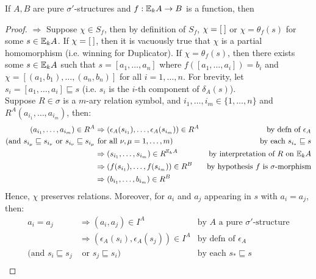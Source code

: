 \begin{thm}
If $A,B$ are pure $\sigma'$-structures and $f:{\mathbb{E}_{k}A} \rightarrow B$ is a function, then 
\begin{proof}
$\Rightarrow$ Suppose $\chi \in S_{f}$, then by definition of $S_{f}$, $\chi = {[\:]}$ or $\chi = \theta_{f}(s)$ for some $s \in {\mathbb{E}_{k}A}$. If $\chi = {[\:]}$, then it is vacuously true that $\chi$ is a partial homomorphism (i.e. winning for Duplicator). If $\chi = \theta_{f}(s)$, then there exists some $s \in {\mathbb{E}_{k}A}$ such that $s = [a_{1},\dots,a_{n}]$ where $f([a_{1},\dots,a_{i}]) = b_{i}$ and $\chi = [(a_{1},b_{1}),\dots,(a_{n},b_{n})]$ for all $i = 1,\dots,n$. For brevity, let $s_{i} = [a_{1},\dots,a_{i}] \sqsubseteq s$ (i.e. $s_{i}$ is the $i$-th component of $\delta_{A}(s)$). \\
Suppose $R \in \sigma$ is a $m$-ary relation symbol, and $i_{1},\dots,i_{m} \in \{1,\dots,n\}$ and $R^{A}(a_{i_{1}},\dots,a_{i_{m}})$, then:
\begin{align*}
(a_{i_{1}},\dots,a_{i_{m}}) \in R^{A} &\Rightarrow (\epsilon_{A}(s_{i_{1}}),\dots,\epsilon_{A}(s_{i_{m}})) \in R^{A} & \text{by defn of $\epsilon_{A}$} \\
\text{(and } s_{i_{\mu}} \sqsubseteq s_{i_{\nu}} \text{ or } s_{i_{\nu}} \sqsubseteq s_{i_{\mu}} &\text{ for all } \nu,\mu = 1,\dots,m\text{)} &\text{by each } s_{i_{*}} \sqsubseteq s \\
&\Rightarrow (s_{i_{1}},\dots,s_{i_{m}}) \in R^{{\mathbb{E}_{k}A}} & \text{by interpretation of $R$ on ${\mathbb{E}_{k}A}$} \\
&\Rightarrow (f(s_{i_{1}}),\dots,f(s_{i_{m}})) \in R^{B} & \text{by hypothesis $f$ is $\sigma$-morphism}\\
&\Rightarrow (b_{i_{1}},\dots,b_{i_{m}}) \in R^{B}
\end{align*}
Hence, $\chi$ preserves relations.
Moreover, for $a_{i}$ and $a_{j}$ appearing in $s$ with $a_{i} = a_{j}$, then:
\begin{align*}
a_{i} = a_{j}       &\Rightarrow (a_{i},a_{j}) \in I^{A} & \text{by $A$ a pure $\sigma'$-structure} \\
&\Rightarrow (\epsilon_{A}(s_{i}),\epsilon_{A}(s_{j})) \in I^{A} & \text{by defn of $\epsilon_{A}$} \\
\text{(and } s_{i} \sqsubseteq s_{j} &\text{ or } s_{j} \sqsubseteq s_{i}\text{)} &\text{by each } s_{*} \sqsubseteq s \\

\end{align*}
\end{proof}
\end{thm}
